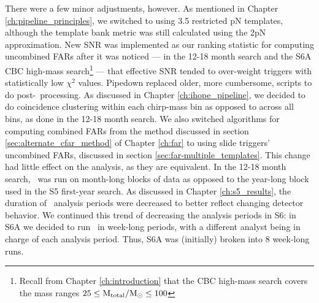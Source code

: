 There were a few minor adjustments, however. As mentioned in Chapter
\ref{ch:pipeline_principles}, we switched to using 3.5 restricted \ac{pN}
templates, although the template bank metric was still calculated using the
2\ac{pN} approximation. New \ac{SNR} was implemented as our ranking statistic
for computing uncombined \acp{FAR} after it was noticed --- in the 12-18 month
search and the S6A \ac{CBC} high-mass search\footnote{Recall from Chapter
\ref{ch:introduction} that the \ac{CBC} high-mass search covers the mass ranges
$25 \leq \mathrm{M_{total}}/\mathrm{M_\odot} \leq 100$} --- that effective \ac{SNR} tended to
over-weight triggers with statistically low $\chi^2$ values. Pipedown replaced
older, more cumbersome, scripts to do post-\hipe~processing. As discussed in
Chapter \ref{ch:ihope_pipeline}, we decided to do coincidence clustering within
each chirp-mass bin as opposed to across all bins, as done in the 12-18 month
search. We also switched algorithms for computing combined \acp{FAR} from the
method discussed in section \ref{sec:alternate_cfar_method} of Chapter
\ref{ch:far} to using slide triggers' uncombined \acp{FAR}, discussed in
section \ref{sec:far-multiple_templates}. This change had little effect on the
analysis, as they are equivalent. In the 12-18 month search, \ihope~was run on
month-long blocks of data as opposed to the year-long block used in the \ac{S5}
first-year search. As discussed in Chapter \ref{ch:s5_results}, the duration of
\ihope~analysis periods were decreased to better reflect changing detector
behavior. We continued this trend of decreasing the analysis periods in
\ac{S6}: in S6A we decided to run \ihope~in week-long periods, with a different
analyst being in charge of each analysis period. Thus, S6A was (initially)
broken into 8 week-long runs.

